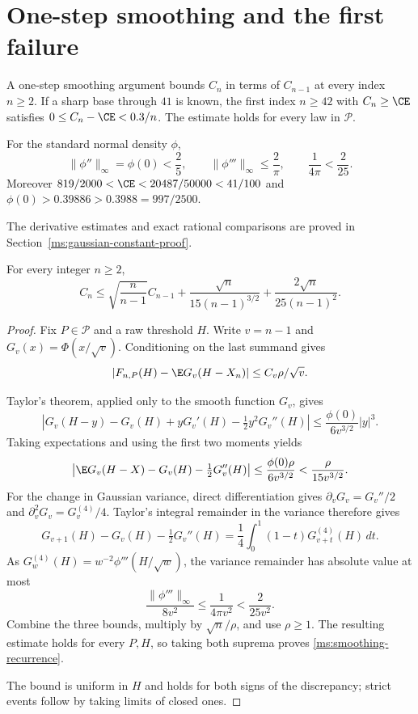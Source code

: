 \section{One-step smoothing and the first failure}
\label{ms:smoothing}

A one-step smoothing argument bounds $C_n$ in terms of $C_{n-1}$ at every index $n\ge2$. If a sharp base through $41$ is known, the first index $n\ge42$
with $C_n\ge\CE$ satisfies $0\le C_n-\CE<0.3/n$. The estimate holds for every law in $\mathcal P$.

\begin{lemma}
\label{ms:gaussian-constants}
For the standard normal density $\phi$,
\[
 \|\phi''\|_\infty=\phi(0)<\frac25,
 \qquad \|\phi'''\|_\infty\le\frac2\pi,
 \qquad \frac1{4\pi}<\frac2{25}.
\]
Moreover $819/2000<\CE<20487/50000<41/100$ and
$\phi(0)>0.39886>0.3988=997/2500$.
\end{lemma}
The derivative estimates and exact rational comparisons are proved in
Section~\ref{ms:gaussian-constant-proof}.

\begin{theorem}
\label{ms:one-step}
For every integer $n\ge2$,
\begin{equation}
 C_n\le\sqrt{\frac n{n-1}}C_{n-1}
       +\frac{\sqrt n}{15(n-1)^{3/2}}
       +\frac{2\sqrt n}{25(n-1)^2}.
\label{ms:smoothing-recurrence}
\end{equation}
\end{theorem}
\begin{proof}
Fix $P\in\mathcal P$ and a raw threshold $H$. Write $v=n-1$ and
$G_v(x)=\Phi(x/\sqrt v)$. Conditioning on the last summand gives
\[
 \left|F_{n,P}(H)-\E G_v(H-X_n)\right|
 \le C_v\rho/\sqrt v.
\]

Taylor's theorem, applied only to the smooth function $G_v$, gives
\[
 \left|G_v(H-y)-G_v(H)+yG_v'(H)-\tfrac12y^2G_v''(H)\right|
 \le\frac{\phi(0)}{6v^{3/2}}|y|^3.
\]
Taking expectations and using the first two moments yields
\[
 \left|\E G_v(H-X)-G_v(H)-\tfrac12G_v''(H)\right|
 \le\frac{\phi(0)\rho}{6v^{3/2}}<\frac\rho{15v^{3/2}}.
\]
For the change in Gaussian variance, direct differentiation gives
$\partial_vG_v=G_v''/2$ and $\partial_v^2G_v=G_v^{(4)}/4$.
Taylor's integral remainder in the variance therefore gives
\[
 G_{v+1}(H)-G_v(H)-\tfrac12G_v''(H)
   =\frac14\int_0^1(1-t)G_{v+t}^{(4)}(H)\,dt.
\]
As $G_w^{(4)}(H)=w^{-2}\phi'''(H/\sqrt w)$, the variance remainder
has absolute value at most
\[
 \frac{\|\phi'''\|_\infty}{8v^2}
       \le\frac1{4\pi v^2}<\frac2{25v^2}.
\]
Combine the three bounds, multiply by $\sqrt n/\rho$, and use $\rho\ge1$.
The resulting estimate holds for every $P,H$, so taking both suprema proves
\eqref{ms:smoothing-recurrence}.

The bound is uniform in $H$ and holds for both signs of the
discrepancy; strict events follow by taking limits of closed ones.
\end{proof}

